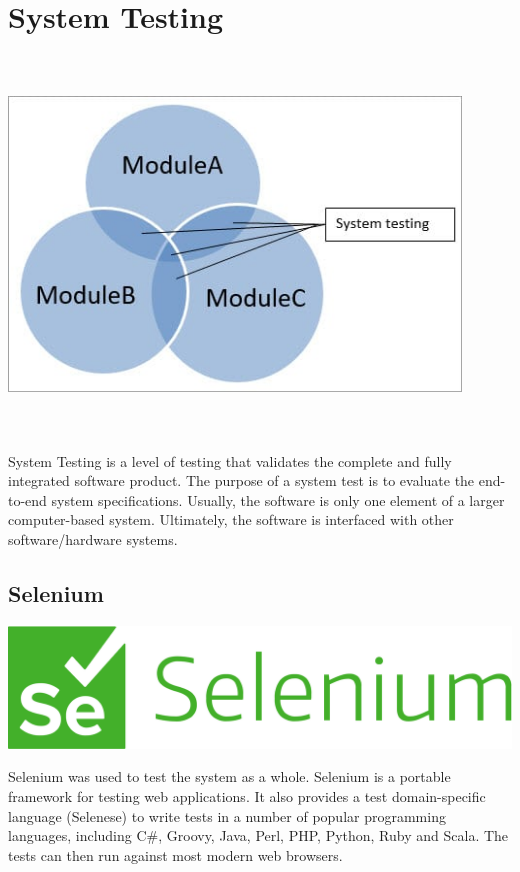 \section{System Testing}
\begin{center}
    \includegraphics[width=12cm,height=10cm,keepaspectratio]{images/system-testing-example}
\end{center}
System Testing is a level of testing that validates the complete and fully
integrated software product. The purpose of a system test is to evaluate the 
end-to-end system specifications. Usually, the software is only one element of a
larger computer-based system. Ultimately, the software is interfaced with other 
software/hardware systems.

\subsection{Selenium}
\begin{center}
    \includegraphics[scale=0.15,keepaspectratio]{images/selenium_logo_large}
\end{center}
Selenium was used to test the system as a whole. Selenium is a portable framework for testing web applications. It also provides a test domain-specific language (Selenese) to write tests in a number of popular programming languages, including C#, Groovy, Java, Perl, PHP, Python, Ruby and Scala. The tests can then run against most modern web browsers.

